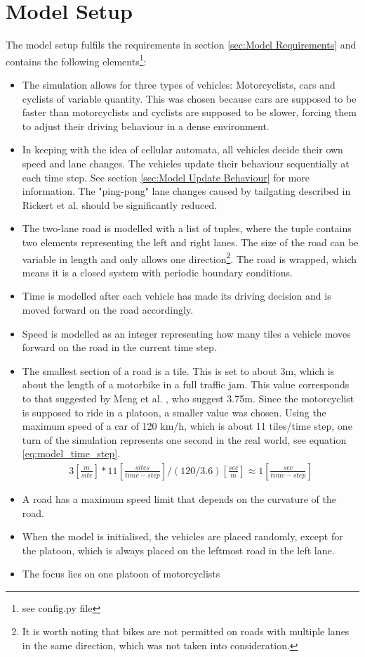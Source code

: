 \section{Model Setup}
\label{sec:Model Setup}
The model setup fulfils the requirements in section \ref{sec:Model Requirements} and contains the following elements\footnote{see config.py file}:
\begin{itemize}
\item The simulation allows for three types of vehicles: Motorcyclists, cars and cyclists of variable quantity. This was chosen because cars are supposed to be faster than motorcyclists and cyclists are supposed to be slower, forcing them to adjust their driving behaviour in a dense environment.
\item In keeping with the idea of cellular automata, all vehicles decide their own speed and lane changes. The vehicles update their behaviour sequentially at each time step. See section \ref{sec:Model Update Behaviour} for more information. The "ping-pong" lane changes caused by tailgating described in Rickert et al.\cite{RICKERT1996534} should be significantly reduced.
\item The two-lane road is modelled with a list of tuples, where the tuple contains two elements representing the left and right lanes. The size of the road can be variable in length and only allows one direction\footnote{It is worth noting that bikes are not permitted on roads with multiple lanes in the same direction, which was not taken into consideration.}. The road is wrapped, which means it is a closed system with periodic boundary conditions. 
\item Time is modelled after each vehicle has made its driving decision and is moved forward on the road accordingly.
\item Speed is modelled as an integer representing how many tiles a vehicle moves forward on the road in the current time step.
\item The smallest section of a road is a tile. This is set to about 3m, which is about the length of a motorbike in a full traffic jam. This value corresponds to that suggested by Meng et al. \cite{MENG2007470}, who suggest 3.75m. Since the motorcyclist is supposed to ride in a platoon, a smaller value was chosen. Using the maximum speed of a car of 120 km/h, which is about 11 tiles/time step, one turn of the simulation represents one second in the real world, see equation \ref{eq:model_time_step}.
    \begin{align}
        3[\frac{m}{site}] * 11[\frac{sites}{time-step}] / (120/3.6)[\frac{sec}{m}]\approx 1[\frac{sec}{time-step}]
        \label{eq:model_time_step}
    \end{align}
\item A road has a maximum speed limit that depends on the curvature of the road. 
\item When the model is initialised, the vehicles are placed randomly, except for the platoon, which is always placed on the leftmost road in the left lane.
\item The focus lies on one platoon of motorcyclists 
\end{itemize}

